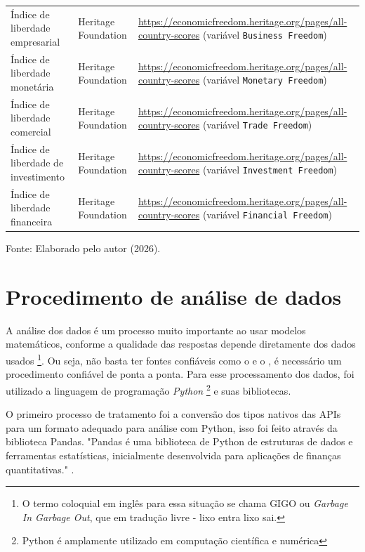 \begin{table}[htb]
{\begin{tabular}{p{4.2cm} p{2.8cm} p{9cm}}
			Índice de liberdade empresarial & Heritage Foundation & \small \url{https://economicfreedom.heritage.org/pages/all-country-scores} (variável \texttt{Business Freedom}) \\
			Índice de liberdade monetária & Heritage Foundation & \small \url{https://economicfreedom.heritage.org/pages/all-country-scores} (variável \texttt{Monetary Freedom}) \\
			Índice de liberdade comercial & Heritage Foundation & \small \url{https://economicfreedom.heritage.org/pages/all-country-scores} (variável \texttt{Trade Freedom}) \\
			Índice de liberdade de investimento & Heritage Foundation & \small \url{https://economicfreedom.heritage.org/pages/all-country-scores} (variável \texttt{Investment Freedom}) \\
			Índice de liberdade financeira & Heritage Foundation & \small \url{https://economicfreedom.heritage.org/pages/all-country-scores} (variável \texttt{Financial Freedom}) \\
			\hline
		\end{tabular}
	}
	
	\vspace{0.2cm}
	\raggedright
	\footnotesize Fonte: Elaborado pelo autor (2026).
\end{table}

\section{Procedimento de análise de dados}

A análise dos dados é um processo muito importante ao usar modelos matemáticos, conforme  a qualidade das respostas depende diretamente dos dados usados 
\footnote{O termo coloquial em inglês para essa situação se chama GIGO ou \textit{Garbage In Garbage Out}, que em tradução livre - lixo entra lixo sai.}.
Ou seja, não basta ter fontes confiáveis como o  e o , é necessário um procedimento confiável de ponta a ponta.
Para esse processamento dos dados, foi utilizado a linguagem de programação \textit{Python}
\footnote{Python é amplamente utilizado em computação científica e numérica }
e suas bibliotecas.


O primeiro processo de tratamento foi a conversão dos tipos nativos das APIs para um formato adequado para análise com Python, isso foi feito através da biblioteca Pandas. "Pandas é uma biblioteca de Python de estruturas de dados e ferramentas estatísticas, inicialmente desenvolvida para aplicações de finanças quantitativas." .

